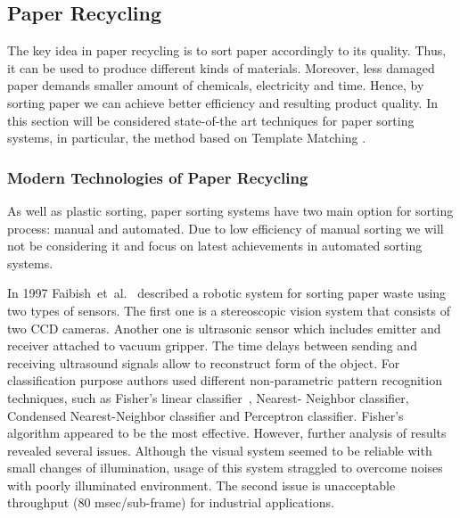 \documentclass{lutmscthesis}[2010/09/22]
\begin{document}
\subsection{ Paper Recycling }

The key idea in paper recycling is to sort
paper accordingly to its quality. Thus, it can
be used to produce different kinds of materials.
Moreover, less damaged paper demands smaller
amount of chemicals, electricity and time. Hence,
by sorting paper we can achieve better efficiency
and resulting product quality. In this section will be
considered state-of-the art techniques for paper sorting
systems, in particular, the method based on Template Matching
\cite{Rahman2009matching}.

\subsubsection*{ Modern Technologies of Paper Recycling }
As well as plastic sorting, paper
sorting systems have two main option for sorting process: manual
and automated. Due to low efficiency of manual sorting we will not be considering
it and focus on latest achievements in automated sorting systems.

In 1997 Faibish~et~al.~\cite{Faibish:1997} described a robotic system for sorting paper waste
using two types of sensors. The first one is a stereoscopic
vision system that consists of two CCD cameras. Another one is ultrasonic
sensor which includes emitter and receiver attached to vacuum gripper.
The time delays between sending and receiving ultrasound signals allow
to reconstruct form of the object. For classification
purpose authors used different non-parametric pattern recognition
techniques, such as Fisher's linear classifier~\cite{Fisher:1936}, Nearest- Neighbor
classifier, Condensed Nearest-Neighbor classifier and
Perceptron classifier. Fisher's algorithm appeared to be the most effective.
However, further analysis of results revealed several issues. Although
the visual system seemed to be reliable with small changes
of illumination, usage of this system straggled to overcome
noises with poorly illuminated environment. The second issue
is unacceptable throughput (80 msec/sub-frame) for industrial applications.
\end{document}
